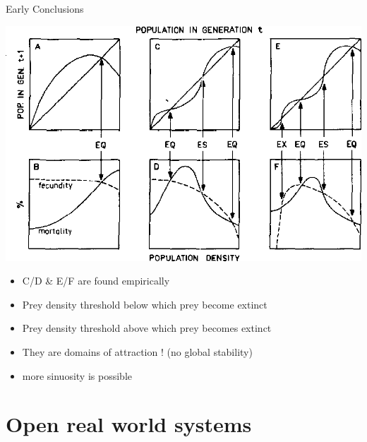 \documentclass[11,aspectratio=1610]{beamer}
\begin{document}
\begin{frame}{Early Conclusions}


\centering
\includegraphics[height=0.5\textheight]{img/reproduction_curves.png}
\begin{footnotesize}
\begin{itemize}
\item C/D \& E/F are  found empirically  
\item Prey density threshold \alert{below which} prey become extinct
\item Prey density threshold \alert{above which} prey becomes extinct 
\item They are domains of attraction ! (no global stability)
\item more sinuosity is possible 
\end{itemize}

  \end{footnotesize}

\end{frame}






\section{Open real world systems}
\end{document}
